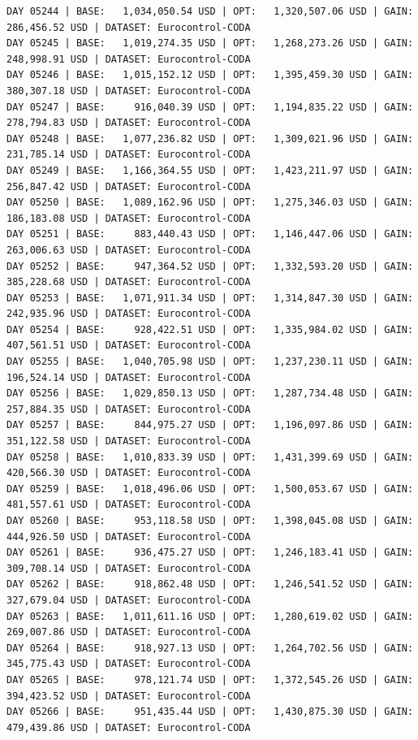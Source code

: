 \documentclass[11pt,a4paper]{article}
\begin{document}
\begin{verbatim}
DAY 05244 | BASE:   1,034,050.54 USD | OPT:   1,320,507.06 USD | GAIN: 286,456.52 USD | DATASET: Eurocontrol-CODA
DAY 05245 | BASE:   1,019,274.35 USD | OPT:   1,268,273.26 USD | GAIN: 248,998.91 USD | DATASET: Eurocontrol-CODA
DAY 05246 | BASE:   1,015,152.12 USD | OPT:   1,395,459.30 USD | GAIN: 380,307.18 USD | DATASET: Eurocontrol-CODA
DAY 05247 | BASE:     916,040.39 USD | OPT:   1,194,835.22 USD | GAIN: 278,794.83 USD | DATASET: Eurocontrol-CODA
DAY 05248 | BASE:   1,077,236.82 USD | OPT:   1,309,021.96 USD | GAIN: 231,785.14 USD | DATASET: Eurocontrol-CODA
DAY 05249 | BASE:   1,166,364.55 USD | OPT:   1,423,211.97 USD | GAIN: 256,847.42 USD | DATASET: Eurocontrol-CODA
DAY 05250 | BASE:   1,089,162.96 USD | OPT:   1,275,346.03 USD | GAIN: 186,183.08 USD | DATASET: Eurocontrol-CODA
DAY 05251 | BASE:     883,440.43 USD | OPT:   1,146,447.06 USD | GAIN: 263,006.63 USD | DATASET: Eurocontrol-CODA
DAY 05252 | BASE:     947,364.52 USD | OPT:   1,332,593.20 USD | GAIN: 385,228.68 USD | DATASET: Eurocontrol-CODA
DAY 05253 | BASE:   1,071,911.34 USD | OPT:   1,314,847.30 USD | GAIN: 242,935.96 USD | DATASET: Eurocontrol-CODA
DAY 05254 | BASE:     928,422.51 USD | OPT:   1,335,984.02 USD | GAIN: 407,561.51 USD | DATASET: Eurocontrol-CODA
DAY 05255 | BASE:   1,040,705.98 USD | OPT:   1,237,230.11 USD | GAIN: 196,524.14 USD | DATASET: Eurocontrol-CODA
DAY 05256 | BASE:   1,029,850.13 USD | OPT:   1,287,734.48 USD | GAIN: 257,884.35 USD | DATASET: Eurocontrol-CODA
DAY 05257 | BASE:     844,975.27 USD | OPT:   1,196,097.86 USD | GAIN: 351,122.58 USD | DATASET: Eurocontrol-CODA
DAY 05258 | BASE:   1,010,833.39 USD | OPT:   1,431,399.69 USD | GAIN: 420,566.30 USD | DATASET: Eurocontrol-CODA
DAY 05259 | BASE:   1,018,496.06 USD | OPT:   1,500,053.67 USD | GAIN: 481,557.61 USD | DATASET: Eurocontrol-CODA
DAY 05260 | BASE:     953,118.58 USD | OPT:   1,398,045.08 USD | GAIN: 444,926.50 USD | DATASET: Eurocontrol-CODA
DAY 05261 | BASE:     936,475.27 USD | OPT:   1,246,183.41 USD | GAIN: 309,708.14 USD | DATASET: Eurocontrol-CODA
DAY 05262 | BASE:     918,862.48 USD | OPT:   1,246,541.52 USD | GAIN: 327,679.04 USD | DATASET: Eurocontrol-CODA
DAY 05263 | BASE:   1,011,611.16 USD | OPT:   1,280,619.02 USD | GAIN: 269,007.86 USD | DATASET: Eurocontrol-CODA
DAY 05264 | BASE:     918,927.13 USD | OPT:   1,264,702.56 USD | GAIN: 345,775.43 USD | DATASET: Eurocontrol-CODA
DAY 05265 | BASE:     978,121.74 USD | OPT:   1,372,545.26 USD | GAIN: 394,423.52 USD | DATASET: Eurocontrol-CODA
DAY 05266 | BASE:     951,435.44 USD | OPT:   1,430,875.30 USD | GAIN: 479,439.86 USD | DATASET: Eurocontrol-CODA

\end{verbatim}
\end{document}
